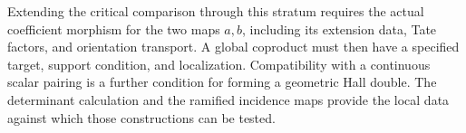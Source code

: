 Extending the critical comparison through this stratum requires
the actual coefficient morphism for the two maps $a,b$, including
its extension data, Tate factors, and orientation transport.
A global coproduct must then have a specified target, support
condition, and localization. Compatibility with a continuous scalar
pairing is a further condition for forming a geometric Hall double.
The determinant calculation and the ramified incidence maps provide
the local data against which those constructions can be tested.
